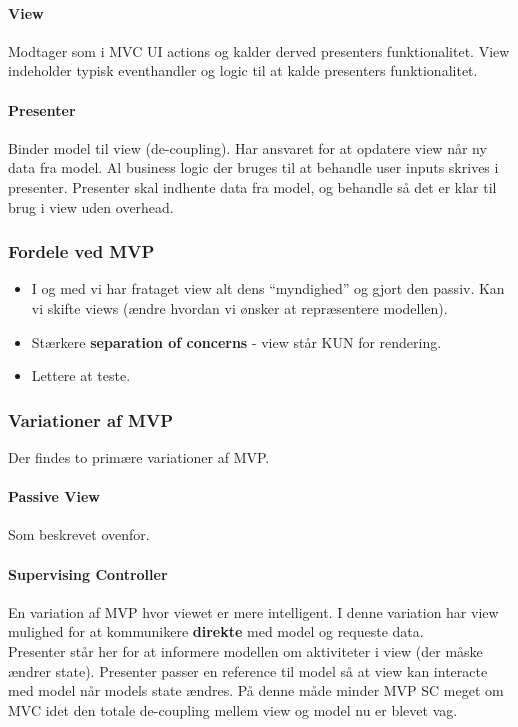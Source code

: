 \paragraph{View} Modtager som i MVC UI actions og kalder derved presenters funktionalitet. View indeholder typisk eventhandler og logic til at kalde presenters funktionalitet.
\paragraph{Presenter} Binder model til view (de-coupling). Har ansvaret for at opdatere view når ny data fra model. Al business logic der bruges til at behandle user inputs skrives i presenter. Presenter skal indhente data fra model, og behandle så det er klar til brug i view uden overhead.

\subsubsection{Fordele ved MVP}
\begin{itemize}
	\item I og med vi har frataget view alt dens “myndighed” og gjort den passiv. Kan vi skifte views (ændre hvordan vi ønsker at repræsentere modellen).
	\item Stærkere \textbf{separation of concerns} - view står KUN for rendering.
	\item Lettere at teste.
\end{itemize}

\subsubsection{Variationer af MVP}
Der findes to primære variationer af MVP.

\paragraph{Passive View}
Som beskrevet ovenfor.

\paragraph{Supervising Controller}
En variation af MVP hvor viewet er mere intelligent. I denne variation har view mulighed for at kommunikere \textbf{direkte} med model og requeste data. \\

Presenter står her for at informere modellen om aktiviteter i view (der måske ændrer state). Presenter passer en reference til model så at view kan interacte med model når models state ændres. På denne måde minder MVP SC meget om MVC idet den totale de-coupling mellem view og model nu er blevet vag.


